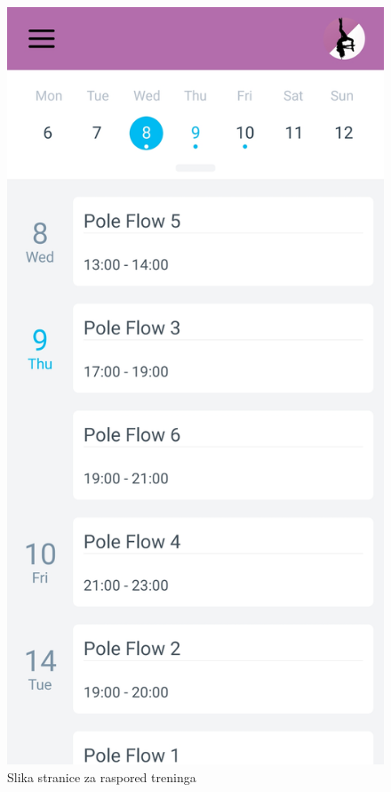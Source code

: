 \documentclass[times, utf8, zavrsni]{fer}
\begin{document}
			\begin{figure}[H]
        			\includegraphics[scale=0.2]{slike/App_raspored_treninga.jpg}
        			\centering
        			\caption{Slika stranice za raspored treninga}
        			\label{fig:promjene}
        		\end{figure}
        		
\end{document}
